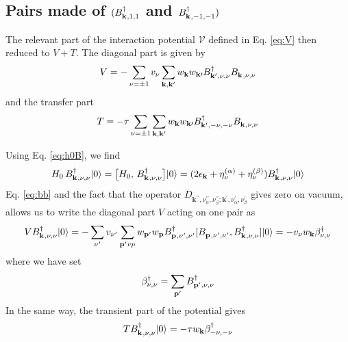 \documentclass[11pt]{article} %
\begin{document}
\subsection{ Pairs made of $(B^{\dagger}_{\mathbf{k}^{ },1,1}$ and $B^{\dagger}_{\mathbf{k}^{ },-1,-1})$}

The relevant part of the interaction potential $\mathcal{V}$ defined in Eq. \ref{eq:V} then reduced to $V+T$. The diagonal part is given by 
\begin{equation}\label{eq:V}
V=-\sum_{\nu=\pm1}v_{\nu}\sum_{\mathbf{k},\mathbf{k}^{{\prime}}}
w_{\mathbf{k}}w_{\mathbf{k}{\prime}}
B^{\dagger}_{\mathbf{k}^{{\prime}},\nu,\nu}
B^{}_{\mathbf{k}^{ },\nu,\nu}
\end{equation}
and the transfer part 
\begin{equation}\label{eq:T}
T=-\tau\sum_{\nu=\pm1}\sum_{\mathbf{k},\mathbf{k}^{{\prime}}}
w_{\mathbf{k}}w_{\mathbf{k}{\prime}}
B^{\dagger}_{\mathbf{k}^{{\prime}},-\nu,-\nu}
B^{}_{\mathbf{k}^{ },\nu,\nu}
\end{equation}

Using Eq. \ref{eq:h0B}, we find
\begin{equation}
H_0\,B^{\dagger}_{\mathbf{k}^{ },\nu,\nu}|0\rangle=
\big[H_0,\,B^{\dagger}_{\mathbf{k}^{ },\nu,\nu}\big]|0\rangle=
(2\epsilon_{\mathbf{k}}+\eta_{\nu}^{(\alpha)}+\eta_{\nu}^{(\beta)})B^{\dagger}_{\mathbf{k}^{ },\nu,\nu}|0\rangle
\end{equation}
Eq. \ref{eq:bb} and the fact that the operator $D^{}_{\mathbf{k}^{{\prime}{\prime} },\nu_{\alpha}^{{\prime}{\prime}},\nu_{\beta}^{{\prime}{\prime}};\mathbf{k}^{{\prime} },\nu_{\alpha}^{{\prime}},\nu_{\beta}^{{\prime}}}$ gives zero on vacuum, allows us to write the diagonal part $V$ acting on one pair as 
\begin{equation}
VB^{\dagger}_{\mathbf{k}^{ },\nu,\nu}|0\rangle=-\sum_{\nu^{{\prime}}}v_{\nu^{{\prime}}}\sum_{\mathbf{p}^{{\prime}}vp^{}}w_{\mathbf{p}^{{\prime}}}w_{\mathbf{p}}B^{\dagger}_{\mathbf{p}^{ },\nu^{{\prime}},\nu^{{\prime}}}[B^{}_{\mathbf{p}^{ },\nu^{{\prime}},\nu^{{\prime}}},B^{\dagger}_{\mathbf{k}^{ },\nu,\nu}]|0\rangle=-v_{\nu}w_{\mathbf{k}}\beta^{\dagger}_{\nu,\nu}
\end{equation}
where we have set
\begin{equation}\label{eq:beta}
\beta^{\dagger}_{\nu,\nu}=\sum_{\mathbf{p}^{{\prime}}}B^{\dagger}_{\mathbf{p}^{{\prime}},\nu,\nu}
\end{equation}
In the same way, the transient part of the potential gives
\begin{equation}
TB^{\dagger}_{\mathbf{k}^{ },\nu,\nu}|0\rangle=-\tau{}w_{\mathbf{k}}\beta^{\dagger}_{-\nu,-\nu}
\end{equation}
\end{document}
